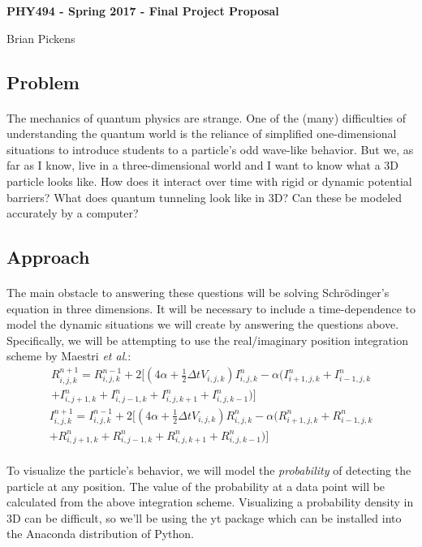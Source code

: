 \documentclass[11pt, letterpaper]{article}
\begin{document}
 
\centerline{\textbf{\Large PHY494 - Spring 2017 - Final Project Proposal}}
\centerline{\large Brian Pickens}
\hfill
\subsection*{Problem}
\paragraph{} The mechanics of quantum physics are strange. One of the (many) difficulties of understanding the quantum world is the reliance of simplified one-dimensional situations to introduce students to a particle's odd wave-like behavior. But we, as far as I know, live in a three-dimensional world and I want to know what a 3D particle looks like. How does it interact over time with rigid or dynamic potential barriers? What does quantum tunneling look like in 3D? Can these be modeled accurately by a computer?

\subsection*{Approach}
\paragraph{} The main obstacle to answering these questions will be solving Schr\"odinger's equation in three dimensions. It will be necessary to include a time-dependence to model the dynamic situations we will create by answering the questions above. Specifically, we will be attempting to use the real/imaginary position integration scheme by Maestri \textit{et al}.:
\begin{multline}
R^{n+1}_{i,j,k} = R^{n-1}_{i,j,k} + 2[(4\alpha + \frac{1}{2}\Delta tV_{i,j,k})I^n_{i,j,k} - \alpha (I^{n}_{i+1,j,k} + I^{n}_{i-1,j,k}\\ + I^{n}_{i,j+1,k} + I^{n}_{i,j-1,k} + I^{n}_{i,j,k+1} + I^{n}_{i,j,k-1})]
\end{multline}
\begin{multline}
I^{n+1}_{i,j,k} = I^{n-1}_{i,j,k} + 2[(4\alpha + \frac{1}{2}\Delta tV_{i,j,k})R^n_{i,j,k} - \alpha (R^{n}_{i+1,j,k} + R^{n}_{i-1,j,k}\\ + R^{n}_{i,j+1,k} + R^{n}_{i,j-1,k} + R^{n}_{i,j,k+1} + R^{n}_{i,j,k-1})]
\end{multline}
\paragraph{} To visualize the particle's behavior, we will model the \textit{probability} of detecting the particle at any position. The value of the probability at a data point will be calculated from the above integration scheme. Visualizing a probability density in 3D can be difficult, so we'll be using the yt package which can be installed into the Anaconda distribution of Python.
\end{document}
